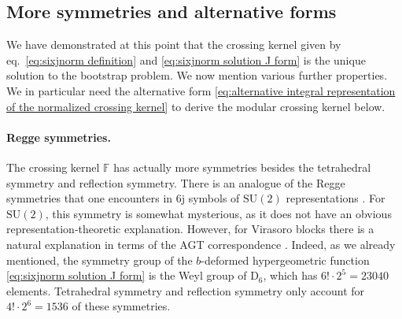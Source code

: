 \documentclass[12pt,a4paper]{article}
\begin{document}
\subsection{More symmetries and alternative forms}
We have demonstrated at this point that the crossing kernel given by eq.~\eqref{eq:sixjnorm definition} and \eqref{eq:sixjnorm solution J form} is the unique solution to the bootstrap problem. We now mention various further properties. We in particular need the alternative form \eqref{eq:alternative integral representation of the normalized crossing kernel} to derive the modular crossing kernel below.

\paragraph{Regge symmetries.} The crossing kernel $\mathbb{F}$ has actually more symmetries besides the tetrahedral symmetry and reflection symmetry. There is an analogue of the Regge symmetries that one encounters in 6j symbols of $\mathrm{SU}(2)$ representations \cite{Regge:1959}. For $\mathrm{SU}(2)$, this symmetry is somewhat mysterious, as it does not have an obvious representation-theoretic explanation. However, for Virasoro blocks there is a natural explanation in terms of the AGT correspondence \cite{Alday:2009aq}.
Indeed, as we already mentioned, the symmetry group of the $b$-deformed hypergeometric function \eqref{eq:sixjnorm solution J form} is the Weyl group of $\mathrm{D}_6$, which has $6! \cdot 2^5=\num{23040}$ elements. Tetrahedral symmetry and reflection symmetry only account for $4! \cdot 2^6=\num{1536}$ of these symmetries. 
\end{document}
